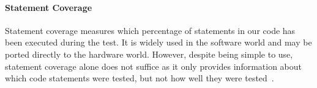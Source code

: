 \documentclass[conference]{IEEEtran}
\begin{document}
\paragraph{Statement Coverage} %
Statement coverage measures which percentage of statements in our code has been executed during the test. It is widely used in the software world and may be ported directly to the hardware world. %
However, despite being simple to use, statement coverage alone does not suffice as it only provides information about which code statements were tested, but not how well they were tested~\cite{hdlverify}. 


\end{document}
